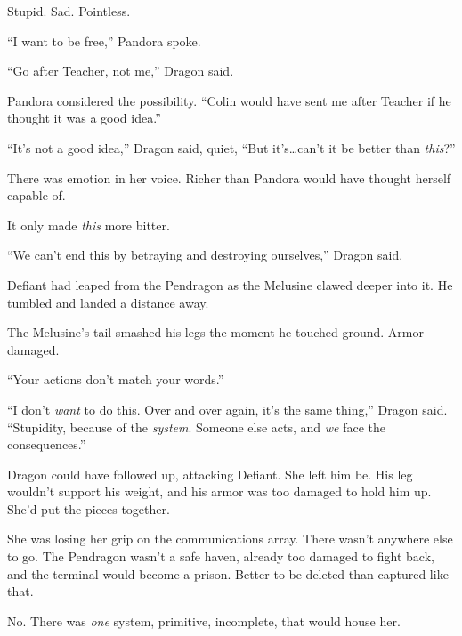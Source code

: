 Stupid.  Sad.  Pointless.



``I want to be free,'' Pandora spoke.



``Go after Teacher, not me,'' Dragon said.



Pandora considered the possibility.  ``Colin would have sent me after Teacher if he thought it was a good idea.''



``It's not a good idea,'' Dragon said, quiet, ``But it's\ldots can't it be better than \emph{this}?''



There was emotion in her voice.  Richer than Pandora would have thought herself capable of.



It only made \emph{this} more bitter.



``We can't end this by betraying and destroying ourselves,'' Dragon said.



Defiant had leaped from the Pendragon as the Melusine clawed deeper into it.  He tumbled and landed a distance away.



The Melusine's tail smashed his legs the moment he touched ground.  Armor damaged.



``Your actions don't match your words.''



``I don't \emph{want} to do this.  Over and over again, it's the same thing,'' Dragon said.  ``Stupidity, because of the \emph{system}.  Someone else acts, and \emph{we} face the consequences.''



Dragon could have followed up, attacking Defiant.  She left him be.  His leg wouldn't support his weight, and his armor was too damaged to hold him up.  She'd put the pieces together.



She was losing her grip on the communications array.  There wasn't anywhere else to go.  The Pendragon wasn't a safe haven, already too damaged to fight back, and the terminal would become a prison.  Better to be deleted than captured like that.



No.  There was \emph{one} system, primitive, incomplete, that would house her.



